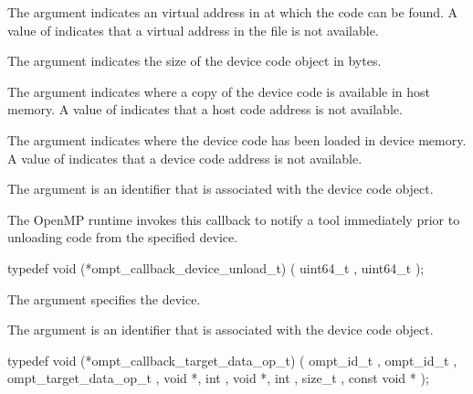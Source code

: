 The argument  indicates an virtual address in  at which the code can be found.
A value of  indicates that a virtual address in the file is not 
available.

The argument  indicates the size of the device code object in bytes.

The argument  indicates where a copy of the device code is available in host memory.
A value of  indicates that a host code address is not available.

The argument  indicates where the device code has been loaded in device memory.
A value of  indicates that a device code address is not available.

The argument  is an identifier that is associated with the device code object.


\label{sec:ompt_callback_device_unload_t}

\summary
The OpenMP runtime invokes this callback to notify a tool immediately prior to unloading code from the specified device.

\format


\begin{ccppspecific}
\begin{omptCallback}
typedef void (*ompt_callback_device_unload_t) (
  uint64_t ,
  uint64_t 
);
\end{omptCallback}

\end{ccppspecific}


\argdesc

The argument  specifies the device.

The argument  is an identifier that is associated with the device code object.


\label{sec:ompt_callback_target_data_op_t}
\format


\begin{ccppspecific}
\begin{omptCallback}
typedef void (*ompt_callback_target_data_op_t) (
  ompt_id_t ,
  ompt_id_t ,
  ompt_target_data_op_t ,
  void *,
  int ,
  void *,
  int ,
  size_t ,
  const void *
);
\end{omptCallback}
\end{ccppspecific}


